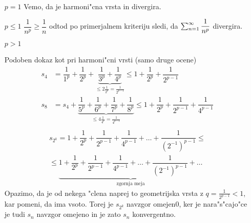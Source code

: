 \begin{itemize}
	\item[$p = 1$] Vemo, da je harmoni"cna vrsta in divergira.
	\item[$p \leq 1$] $\dfrac{1}{n^p} \geq \dfrac{1}{n}$ odtod po primerjalnem kriteriju sledi, da $\sum_{n = 1}^{\infty}\dfrac{1}{n^p}$ divergira.
	\item[$p > 1$] 
	
	Podoben dokaz kot pri harmoni"cni vrsti (samo druge ocene)
	\begin{align*}
	s_4 &= \dfrac{1}{1^p} + \dfrac{1}{2^p} + \underbrace{\dfrac{1}{3^p} + \dfrac{1}{4^p}}_{\leq 2\frac{1}{2^p} = \frac{1}{2^{p-1}}} \leq 1 + \dfrac{1}{2^p} + \dfrac{1}{2^{p-1}} \\
	s_8 &= s_4 + \underbrace{\dfrac{1}{5^p} + \dfrac{1}{6^p} + \dfrac{1}{7^p} + \dfrac{1}{8^p}}_{\leq 4 \frac{1}{4^p} = \frac{1}{4^{p-1}}} \leq 1 + \dfrac{1}{2^p} + \dfrac{1}{2^{p-1}} + \dfrac{1}{4^{p-1}} \\
	\end{align*}
	\begin{multline*}
		s_{2^k} = 1 + \dfrac{1}{2^p} + \dfrac{1}{2^{p-1}} + \dfrac{1}{4^{p-1}} + \ldots + \dfrac{1}{(2^{-1})^{p-1}} \leq \\
		\leq \underbrace{1 + \dfrac{1}{2^p} + \dfrac{1}{2^{p-1}} + \dfrac{1}{4^{p-1}} + \ldots + \dfrac{1}{(2^{-1})^{p-1}} + \ldots}_{\text{zgornja meja}}
	\end{multline*}
	Opazimo, da je od nekega "clena naprej to geometrijska vrsta z $q = \frac{1}{2^{p-1}} < 1$, kar pomeni, da ima vsoto. Torej je $s_{2^k}$ navzgor omejen0, ker je nara"s"cajo"ce je tudi $s_n$ navzgor omejeno in je zato $s_n$ konvergentno.
\end{itemize}